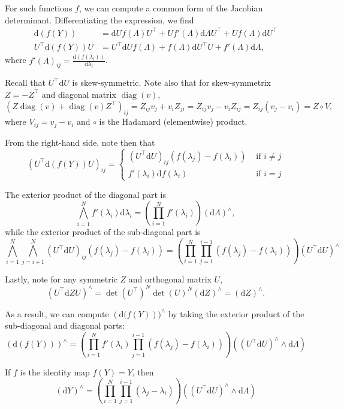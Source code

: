 \documentclass[11pt]{article}
\newcommand{\dv}[1]{\mathrm{d}{#1}}
\begin{document}
For such functions $f$, we can compute a common form of the Jacobian determinant.
Differentiating the expression, we find
\[
\begin{aligned}
  \dv{(f(Y))} &= \dv{U} f(\Lambda) U^\top + U f'(\Lambda) \dv{\Lambda} U^\top + U f(\Lambda) \dv{U}^\top\\
  U^\top \dv{(f(Y))} U &= U^\top \dv{U} f(\Lambda) + f(\Lambda) \dv{U}^\top U + f'(\Lambda)\dv{\Lambda},
\end{aligned}
\]
where $f'(\Lambda)_{ij} = \frac{\dv{(f(\lambda_i))}}{\dv{\lambda_i}}$.

Recall that $U^\top \dv{U}$ is skew-symmetric.
Note also that for skew-symmetrix $Z = -Z^\top$ and diagonal matrix $\operatorname{diag}(v)$,
\[(Z\operatorname{diag}(v) + \operatorname{diag}(v)Z^\top)_{ij} = Z_{ij} v_j + v_i Z_{ji} = Z_{ij} v_j - v_i Z_{ij} = Z_{ij} (v_j - v_i) = Z \circ V,\]
where $V_{ij} = v_j - v_i$ and $\circ$ is the Hadamard (elementwise) product.

From the right-hand side, note then that
\[(U^\top \dv{(f(Y))} U)_{ij} = \begin{cases} (U^\top \dv{U})_{ij} (f(\lambda_j) - f(\lambda_i)) & \text{ if } i \ne j \\ f'(\lambda_i) \dv{f(\lambda_i)} &\text{ if } i = j \end{cases}\]

The exterior product of the diagonal part is
\[
  \bigwedge_{i=1}^N f'(\lambda_i) \dv{\lambda_i} = \left(\prod_{i=1}^N f'(\lambda_i)\right) (\dv{\Lambda})^\wedge,
\]
while the exterior product of the sub-diagonal part is
\[
  \bigwedge_{i=1}^N \bigwedge_{j=i+1}^N (U^\top \dv{U})_{ij} (f(\lambda_j) - f(\lambda_i)) = \left( \prod_{i=1}^N \prod_{j=1}^{i-1} (f(\lambda_j) - f(\lambda_i)) \right) \left(U^\top \dv{U} \right)^\wedge
\]

Lastly, note for any symmetric $Z$ and orthogonal matrix $U$,
\[(U^\top \dv{Z} U)^\wedge = \det(U^\top)^N \det(U)^N (\dv{Z})^\wedge = (\dv{Z})^\wedge.\]

As a result, we can compute $(\dv(f(Y)))^\wedge$ by taking the exterior product of the sub-diagonal and diagonal parts: 
\[(\dv{(f(Y))})^\wedge = \left(\prod_{i=1}^N f'(\lambda_i) \prod_{j=1}^{i-1} (f(\lambda_j) - f(\lambda_i))\right) \left((U^\top \dv{U})^\wedge \wedge \dv{\Lambda}\right)\]

If $f$ is the identity map $f(Y) = Y$, then
\[ (\dv{Y})^\wedge = \left(\prod_{i=1}^N \prod_{j=1}^{i-1} (\lambda_j - \lambda_i)\right) \left((U^\top \dv{U})^\wedge \wedge \dv{\Lambda}\right)\]
\end{document}
